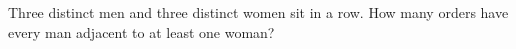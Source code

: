 Three distinct men and three distinct women sit in a row. How many orders have every man adjacent to at least one woman?
